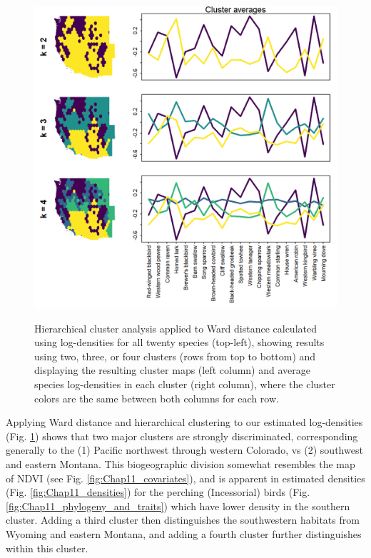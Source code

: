 \begin{figure}[!ht]
    \caption[Biogeographic communities from hierarchical cluster analysis]{Hierarchical cluster analysis applied to Ward distance calculated using log-densities for all twenty species (top-left), showing results using two, three, or four clusters (rows from top to bottom) and displaying the resulting cluster maps (left column) and average species log-densities in each cluster (right column), where the cluster colors are the same between both columns for each row.}
    \includegraphics[width=5.5in]{Chap_11/Clusters-updated.png}
    \label{fig:Chap11_clusters}
\end{figure}

Applying Ward distance and hierarchical clustering to our estimated log-densities (Fig. \ref{fig:Chap11_clusters}) shows that two major clusters are strongly discriminated, corresponding generally to the (1) Pacific northwest through western Colorado, vs (2) southwest and eastern Montana.  This biogeographic division somewhat resembles the map of NDVI (see Fig. \ref{fig:Chap11_covariates}), and is apparent in estimated densities (Fig. \ref{fig:Chap11_densities}) for the perching (Incessorial) birds (Fig. \ref{fig:Chap11_phylogeny_and_traits}) which have lower density in the southern cluster.   Adding a third cluster then distinguishes the southwestern habitats from Wyoming and eastern Montana, and adding a fourth cluster further distinguishes within this cluster.  

